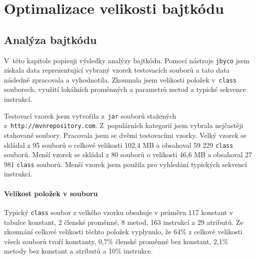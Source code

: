 \chapter{Optimalizace velikosti bajtkódu}\label{Tool}




\section{Analýza bajtkódu}\label{Analysis}


V~této kapitole popisuji výsledky analýzy bajtkódu. Pomocí nástroje \texttt{jbyco} jsem získala data reprezentující vybraný vzorek testovacích souborů a tato data následně zpracovala a vyhodnotila. Zkoumala jsem velikosti položek v~\texttt{class} souborech, využití lokálních proměnných a parametrů metod a typické sekvence instrukcí.

Testovací vzorek jsem vytvořila z~\texttt{jar} souborů stažených z~\texttt{http://mvnrepository.com}. Z~populárních kategorií jsem vybrala nejčastěji stahované soubory. Pracovala jsem se dvěmi testovacími vzorky. Velký vzorek se skládal z 95 souborů o celkové velikosti 102,4 MB a obsahoval 59 229 \texttt{class} souborů. Menší vzorek se skládal z 80 souborů o velikosti 46,6 MB a obsahoval 27 981
\texttt{class} souborů. Menší vzorek jsem použila pro vyhledání typických sekvencí instrukcí.

\subsubsection{Velikost položek v souboru}

Typický \texttt{class} soubor z velkého vzorku obsahuje v průměru 117 konstant v tabulce konstant, 2 členské proměnné, 8 metod, 163 instrukcí a 29 atributů. Ze zkoumání celkové velikosti těchto položek vyplynulo, že 64\% z celkové velikosti všech souborů tvoří konstanty, 0,7\% členské proměnné bez konstant, 2,1\% metody bez konstant a atributů a 10\% instrukce.

